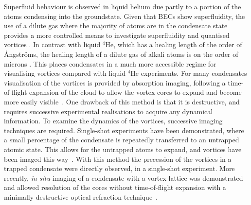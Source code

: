 Superfluid behaviour is observed in liquid helium due partly to a portion of the atoms condensing into the groundstate. Given that BECs show superfluidity, the use of a dilute gas where the majority of atoms are in the condensate state provides a more controlled means to investigate superfluidity and quantised vortices \cite{BK:Ueda_2010,BEC:Srinivasen_pramana_2006,Vtx:Tsubota_arxiv_2010,CT:Tsubota_jpsj_2008}. In contrast with liquid $^4$He, which has a healing length of the order of {\r{A}}ngstr{\"o}ms, the healing length of a dilute gas of alkali atoms is on the order of microns \cite{Vtx:Isoshima_pra_1999}. This places condensates in a much more accessible regime for visualising vortices compared with liquid $^4$He experiments. For many condensates visualisation of the vortices is provided by absorption imaging, following a time-of-flight expansion of the cloud to allow the vortex cores to expand and become more easily visible~\cite{Vtx:Raman_prl_2001,VTX:Rankonjac_pra_2016}. One drawback of this method is that it is destructive, and requires successive experimental realisations to acquire any dynamical information. To examine the dynamics of the vortices, successive imaging techniques are required. Single-shot experiments have been demonstrated, where a small percentage of the condensate is repeatedly transferred to an untrapped atomic state. This allows for the untrapped atoms to expand, and vortices have been imaged this way~\cite{VTX:Freilich_sci_2010}. With this method the precession of the vortices in a trapped condensate were directly observed, in a single-shot experiment. More recently, \textit{in-situ} imaging of a condensate with a vortex lattice was demonstrated and allowed resolution of the cores without time-of-flight expansion with a minimally destructive optical refraction technique~\cite{VTX:Wilson_pra_2015}.

